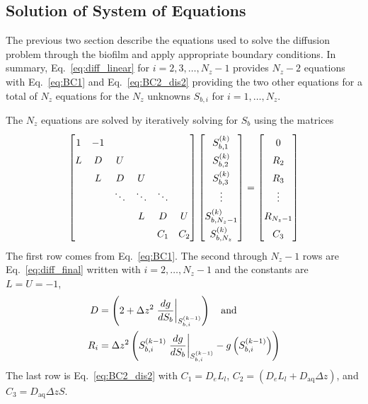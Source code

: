 \documentclass[letterpaper, twoside]{article}
\numberwithin{equation}{section}
\begin{document}
\subsection{Solution of System of Equations}
The previous two section describe the equations used to solve the diffusion problem through
the biofilm and apply appropriate boundary conditions.
In summary, Eq.~\ref{eq:diff_linear} for $i=2,3,\dots,N_z-1$ provides $N_z-2$ equations with
Eq.~\ref{eq:BC1} and Eq.~\ref{eq:BC2_dis2} providing the two other equations
for a total of $N_z$ equations for the $N_z$ unknowns $S_{b,i}$ for $i=1,\dots,N_z$.

The $N_z$ equations are solved by iteratively solving for $S_b$ using the matrices
\begin{equation}
  \label{eq:system}
  \renewcommand*{\arraystretch}{1.5}
  \begin{bmatrix}
    1 &-1  &   &   &   & \\
    L &  D & U &  &   & \\
    ~ & L &  D & U &  & \\
    ~ & ~ & \ddots &  \ddots & \ddots & \\
    ~ & ~ & ~ & L &  D & U\\
    ~ & ~ & ~ & ~ &  C_1 & C_2  
  \end{bmatrix}
  \begin{bmatrix}
    S_{b,1}^{(k)}\\
    S_{b,2}^{(k)}\\
    S_{b,3}^{(k)}\\
   \vdots\\
    S_{b,N_z-1}^{(k)}\\
    S_{b,N_z}^{(k)}
  \end{bmatrix}
  =
    \begin{bmatrix}
   0\\
    R_{2}\\
    R_{3}\\
    \vdots\\
    R_{N_z-1}\\
    C_3
  \end{bmatrix}
\end{equation}
The first row comes from Eq.~\ref{eq:BC1}.
The second through $N_z-1$ rows are Eq.~\ref{eq:diff_final} written with $i=2,\dots,N_z-1$ and the constants are $L=U=-1$,
\begin{align*}
  D&=\left( 2 +\Delta z^2\left.\frac{d g}{d S_b}\right|_{S_{b,i}^{(k-1)}}\right)\text{\quad and}\\
  R_i&=\Delta z^2\left( S_{b,i}^{(k-1)} \left.\frac{d g}{d S_b}\right|_{S_{b,i}^{(k-1)}} - g\left(S_{b,i}^{(k-1)}\right)\right) 
\end{align*}
The last row is Eq.~\ref{eq:BC2_dis2} with $C_1=D_e L_l$, $C_2=\left(D_e L_l + D_{\mathrm{aq}} \Delta z\right)$, and $C_3=D_{\mathrm{aq}} \Delta z S$.
\end{document}
